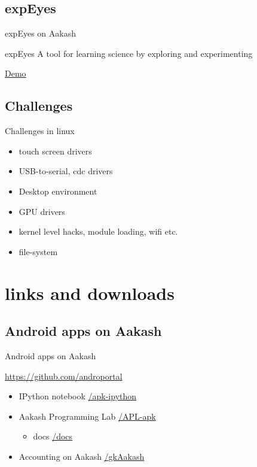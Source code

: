 \documentclass{beamer}
\begin{document}
\subsection{expEyes}
\begin{frame}{expEyes on Aakash}
  \begin{block}{expEyes}
    A tool for learning science by exploring and experimenting
  \end{block}
 \begin{block}{}
    \centerline{\href{file:///home/sachin/Videos/fossin/final.AVI}{Demo}}
  \end{block}
\end{frame}

 \subsection{Challenges}
  \begin{frame}{Challenges in linux}
    \begin{block}{}
      \begin{itemize}
        \item touch screen drivers
        \item USB-to-serial, cdc drivers
        \item Desktop environment
        \item GPU drivers
        \item kernel level hacks, module loading, wifi etc.
        \item file-system
      \end{itemize}
    \end{block}
    \end{frame}
  
  \section{links and downloads}
  \subsection{Android apps on Aakash}
  \begin{frame}{Android apps on Aakash}
    \begin{block}{\url{https://github.com/androportal}}
      \begin{itemize}
      \item IPython notebook \hfill \url{/apk-ipython}
      \item Aakash Programming Lab \hfill \url{/APL-apk}
        \begin{itemize}
        \item docs \hfill \url{/docs}
        \end{itemize}
      \item Accounting on Aakash \hfill \url{/gkAakash}
      \end{itemize}
    \end{block}
  \end{frame}
\end{document}
